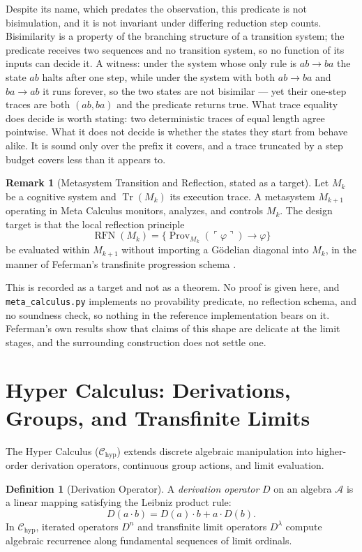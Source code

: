 \documentclass[11pt]{article}
\theoremstyle{definition}
\newtheorem{definition}[theorem]{Definition}
\newtheorem{remark}[theorem]{Remark}
\newcommand{\code}[1]{\ulcorner #1\urcorner}
\begin{document}
\noindent Despite its name, which predates the observation, this predicate is not bisimulation, and it is not invariant under differing reduction step counts. Bisimilarity is a property of the branching structure of a transition system; the predicate receives two sequences and no transition system, so no function of its inputs can decide it. A witness: under the system whose only rule is $ab \to ba$ the state $ab$ halts after one step, while under the system with both $ab \to ba$ and $ba \to ab$ it runs forever, so the two states are not bisimilar --- yet their one-step traces are both $(ab, ba)$ and the predicate returns true. What trace equality does decide is worth stating: two deterministic traces of equal length agree pointwise. What it does not decide is whether the states they start from behave alike. It is sound only over the prefix it covers, and a trace truncated by a step budget covers less than it appears to.

\begin{remark}[Metasystem Transition and Reflection, stated as a target]
Let $M_k$ be a cognitive system and $\operatorname{Tr}(M_k)$ its execution trace. A metasystem $M_{k+1}$ operating in Meta Calculus monitors, analyzes, and controls $M_k$. The design target is that the local reflection principle
\[
\operatorname{RFN}(M_k) = \{\operatorname{Prov}_{M_k}(\code{\varphi}) \to \varphi\}
\]
be evaluated within $M_{k+1}$ without importing a Gödelian diagonal into $M_k$, in the manner of Feferman's transfinite progression schema \cite{feferman}.

This is recorded as a target and not as a theorem. No proof is given here, and \texttt{meta\_calculus.py} implements no provability predicate, no reflection schema, and no soundness check, so nothing in the reference implementation bears on it. Feferman's own results show that claims of this shape are delicate at the limit stages, and the surrounding construction does not settle one.
\end{remark}

\section{Hyper Calculus: Derivations, Groups, and Transfinite Limits}
The Hyper Calculus ($\mathcal{C}_{\mathrm{hyp}}$) extends discrete algebraic manipulation into higher-order derivation operators, continuous group actions, and limit evaluation.

\begin{definition}[Derivation Operator]
A \emph{derivation operator} $D$ on an algebra $\mathcal{A}$ is a linear mapping satisfying the Leibniz product rule:
\[
D(a \cdot b) = D(a) \cdot b + a \cdot D(b).
\]
In $\mathcal{C}_{\mathrm{hyp}}$, iterated operators $D^n$ and transfinite limit operators $D^\lambda$ compute algebraic recurrence along fundamental sequences of limit ordinals.
\end{definition}
\end{document}
